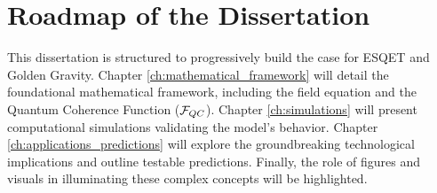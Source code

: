 \section{Roadmap of the Dissertation}
This dissertation is structured to progressively build the case for ESQET and Golden Gravity. Chapter \ref{ch:mathematical_framework} will detail the foundational mathematical framework, including the field equation and the Quantum Coherence Function ($\mathcal{F}_{QC}$). Chapter \ref{ch:simulations} will present computational simulations validating the model's behavior. Chapter \ref{ch:applications_predictions} will explore the groundbreaking technological implications and outline testable predictions. Finally, the role of figures and visuals in illuminating these complex concepts will be highlighted.


